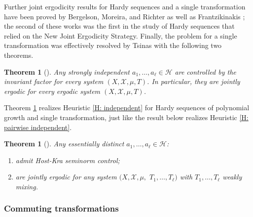 \documentclass[11pt]{amsart}
\newtheorem{theorem}[lemma]{Theorem}
\theoremstyle{definition}
\newcommand{\CH}{{\mathcal H}}
\newcommand{\CX}{{\mathcal X}}
\newcommand{\1}{{\mathbf{1}}}
\begin{document}
Further joint ergodicity results for Hardy sequences and a single transformation have been proved by Bergelson, Moreira, and Richter \cite{BMR20} as well as Frantzikinakis \cite{Fr21}; the second of these works was the first in the study of Hardy sequences that relied on the New Joint Ergodicity Strategy. Finally, the problem for a single transformation was effectively resolved by Tsinas \cite{Ts22} with the following two theorems.
\begin{theorem}%
[{\cite[Theorem 1.2]{Ts22}}]\label{T: Ts strongly independent}
    Any strongly independent $a_1, \ldots, a_\ell\in\CH$ are controlled by the invariant factor for every system $(X, \CX, \mu, T)$. In particular, they are jointly ergodic for every ergodic system $(X, \CX, \mu, T)$.
\end{theorem}
Theorem \ref{T: Ts strongly independent} realizes Heuristic \ref{H: independent} for Hardy sequences of polynomial growth and single transformation, just like the result below realizes Heuristic \ref{H: pairwise independent}.
\begin{theorem}%
[{\cite[Theorem 1.3 and Corollary 1.4]{Ts22}}]\label{T: Ts essentially distinct}
    Any essentially distinct $a_1, \ldots, a_\ell\in\CH$:
    \begin{enumerate}
        \item admit Host-Kra seminorm control;
        \item are jointly ergodic for any system $(X, \CX, \mu,$\! $T_1, \ldots, T_\ell)$ with $T_1, \ldots, T_\ell$ weakly mixing.
    \end{enumerate}
\end{theorem}



\subsubsection{Commuting transformations}\label{SSS: Hardy commuting}
\end{document}
